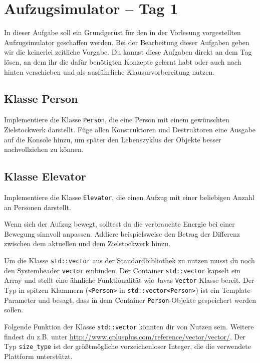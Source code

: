 \section{Aufzugsimulator -- Tag 1}
In dieser Aufgabe soll ein Grundgerüst für den in der Vorlesung vorgestellten Aufzugsimulator geschaffen werden.
Bei der Bearbeitung dieser Aufgaben geben wir die keinerlei zeitliche Vorgabe.
Du kannst diese Aufgaben direkt an dem Tag lösen, an dem ihr die dafür benötigten Konzepte gelernt habt oder auch nach hinten verschieben und als ausführliche Klausurvorbereitung nutzen.

\subsection{Klasse Person}
Implementiere die Klasse \lstinline{Person}, die eine Person mit einem gewünschten Zielstockwerk darstellt.
Füge allen Konstruktoren und Destruktoren eine Ausgabe auf die Konsole hinzu, um später den Lebenszyklus der Objekte besser nachvollziehen zu können.



\subsection{Klasse Elevator}
Implementiere die Klasse \lstinline{Elevator}, die einen Aufzug mit einer beliebigen Anzahl an Personen darstellt.

Wenn sich der Aufzug bewegt, solltest du die verbrauchte Energie bei einer Bewegung sinnvoll anpassen.
Addiere beispielsweise den Betrag der Differenz zwischen dem aktuellen und dem Zielstockwerk hinzu.



Um die Klasse \lstinline{std::vector} aus der Standardbibliothek zu nutzen musst du noch den Systemheader \lstinline{vector} einbinden.
Der Container \lstinline{std::vector} kapselt ein Array und stellt eine ähnliche Funktionalität wie Javas \lstinline{Vector} Klasse bereit.
Der Typ in spitzen Klammern (\lstinline{<Person>} in \lstinline{std::vector<Person>}) ist ein Template-Parameter und besagt, dass in dem Container \lstinline{Person}-Objekte gespeichert werden sollen.

Folgende Funktion der Klasse \lstinline{std::vector} könnten dir von Nutzen sein. Weitere findest du z.B. unter \url{http://www.cplusplus.com/reference/vector/vector/}. Der Typ \lstinline{size_type} ist der größtmögliche vorzeichenloser Integer, die die verwendete Plattform unterstützt.

